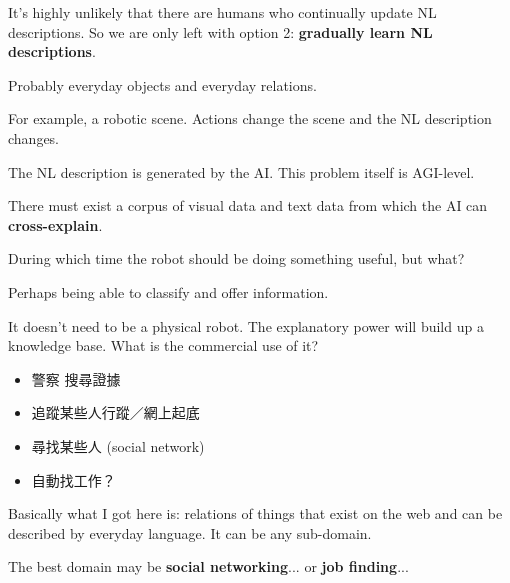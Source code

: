 It's highly unlikely that there are humans who continually update NL descriptions.  So we are only left with option 2:  \textbf{gradually learn NL descriptions}.

Probably everyday objects and everyday relations.

For example, a robotic scene.  Actions change the scene and the NL description changes.

The NL description is generated by the AI.  This problem itself is AGI-level.

There must exist a corpus of visual data and text data from which the AI can \textbf{cross-explain}. 

During which time the robot should be doing something useful, but what?

Perhaps being able to classify and offer information.  

It doesn't need to be a physical robot.  The explanatory power will build up a knowledge base.  What is the commercial use of it?

\begin{itemize}
	\item 警察 搜尋證據
	\item 追蹤某些人行蹤／網上起底
	\item 尋找某些人 (social network)
	\item 自動找工作？
\end{itemize}

Basically what I got here is:  relations of things that exist on the web and can be described by everyday language.  It can be any sub-domain.

The best domain may be \textbf{social networking}... or \textbf{job finding}...


 
